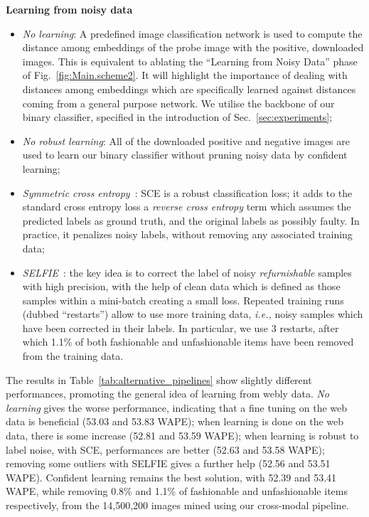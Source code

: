 \documentclass[runningheads]{llncs}
\begin{document}
\vspace{0.1cm}
\noindent\textbf{Learning from noisy data}
\begin{itemize} [noitemsep, leftmargin=*]
    \item{\emph{No learning}}: A predefined image classification network is used to compute the distance among embeddings of the probe image with the positive, downloaded images. This is equivalent to ablating the ``Learning from Noisy Data'' phase of Fig.~\ref{fig:Main.scheme2}. It will highlight the importance of dealing with distances among embeddings which are specifically learned against distances coming from a general purpose network. We utilise the backbone of our binary classifier, specified in the introduction of Sec.~\ref{sec:experiments};
    \item{\emph{No robust learning}}: All of the downloaded positive and negative images are used to learn our binary classifier without pruning noisy data by confident learning;
    \item{\emph{Symmetric cross entropy}~\cite{wang2019symmetric}}: SCE is a robust classification loss; it adds to the standard cross entropy loss a \emph{reverse cross entropy} term which assumes the predicted labels as ground truth, and the original labels as possibly faulty. In practice, it penalizes noisy labels, without removing any associated training data;

    \item{\emph{SELFIE}~\cite{song2019selfie}}: the key idea is to correct the label of noisy \emph{refurnishable} samples with high precision, with the help of clean data which is defined as those samples within a mini-batch creating a small loss. Repeated training runs (dubbed ``restarts'') allow to use more training data, \textit{i.e.,} noisy samples which have been corrected in their labels. In particular, we use 3 restarts, after which 1.1\% of both fashionable and unfashionable items have been removed from the training data.
 \end{itemize}
The results in Table~\ref{tab:alternative_pipelines} show slightly different performances, promoting the general idea of learning from webly data. \emph{No learning} gives the worse performance, indicating that a fine tuning on the web data is beneficial (53.03 and 53.83 WAPE); when learning is done on the web data, there is some increase (52.81 and 53.59 WAPE); when learning is robust to label noise, with SCE, performances are better (52.63 and 53.58 WAPE); removing some outliers with SELFIE gives a further help (52.56 and 53.51 WAPE). Confident learning  remains the best solution, with 52.39 and 53.41 WAPE, while removing 0.8\% and 1.1\% of fashionable and unfashionable items respectively, from the 14,500,200 images mined using our cross-modal pipeline.
\end{document}
